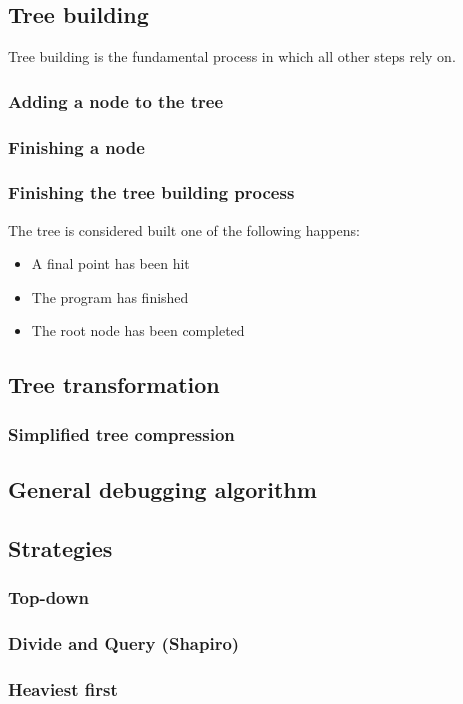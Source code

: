 \subsection{Tree building}
Tree building is the fundamental process in which all other steps rely on.
\subsubsection{Adding a node to the tree}
\subsubsection{Finishing a node}
\subsubsection{Finishing the tree building process}
The tree is considered built one of the following happens:
\begin{itemize}
    \item A final point has been hit
    \item The program has finished
    \item The root node has been completed
\end{itemize}
\subsection{Tree transformation}
\subsubsection{Simplified tree compression}
\subsection{General debugging algorithm}
\subsection{Strategies}
\subsubsection{Top-down}
\subsubsection{Divide and Query (Shapiro)}
\subsubsection{Heaviest first}
